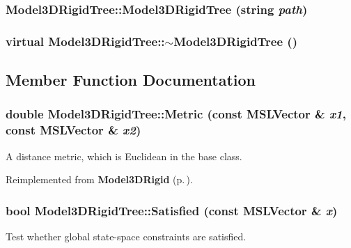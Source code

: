 \subsubsection{\setlength{\rightskip}{0pt plus 5cm}Model3DRigid\-Tree::Model3DRigid\-Tree (string {\em path})}\label{classModel3DRigidTree_a0}


\subsubsection{\setlength{\rightskip}{0pt plus 5cm}virtual Model3DRigid\-Tree::$\sim$Model3DRigid\-Tree ()\hspace{0.3cm}{\tt  [inline, virtual]}}\label{classModel3DRigidTree_a1}




\subsection{Member Function Documentation}
\subsubsection{\setlength{\rightskip}{0pt plus 5cm}double Model3DRigid\-Tree::Metric (const {\bf MSLVector} \& {\em x1}, const {\bf MSLVector} \& {\em x2})\hspace{0.3cm}{\tt  [virtual]}}\label{classModel3DRigidTree_a4}


A distance metric, which is Euclidean in the base class.



Reimplemented from {\bf Model3DRigid} {\rm (p.\,\pageref{classModel3DRigid_a4})}.
\subsubsection{\setlength{\rightskip}{0pt plus 5cm}bool Model3DRigid\-Tree::Satisfied (const {\bf MSLVector} \& {\em x})\hspace{0.3cm}{\tt  [virtual]}}\label{classModel3DRigidTree_a5}


Test whether global state-space constraints are satisfied.



